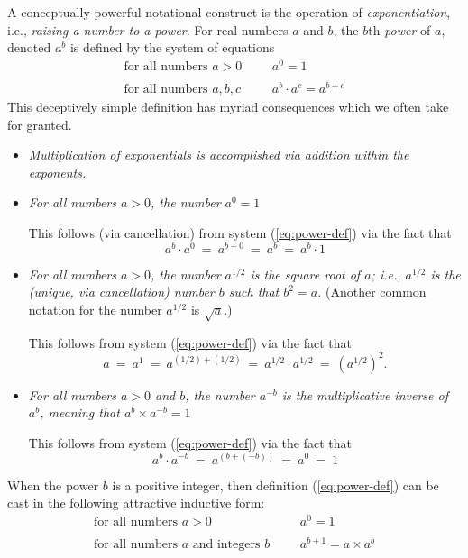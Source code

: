 
A conceptually powerful notational construct is the operation of {\it exponentiation},  i.e., {\it raising a number to a power}.  For real numbers $a$ and $b$, the  $b$th {\it power} of $a$, denoted $a^b$ is defined by the system of equations
\begin{equation}
\label{eq:power-def}
\begin{array}{llll}
\mbox{for all numbers $a>0$} & & & a^0 = 1 \\
 & & & \\
\mbox{for all numbers $a, b, c$} & & & a^b \cdot a^c = a^{b+c}
\end{array}
\end{equation}
This deceptively simple definition has myriad consequences which we often take for granted.
 
\begin{itemize}
\item
{\em Multiplication of exponentials is accomplished via addition within the exponents.}

\medskip\item
{\em For all numbers $a>0$, the number $a^0 = 1$}

\smallskip

This follows (via cancellation) from system (\ref{eq:power-def}) via the fact that
\[ a^b \cdot a^0 \ = \ a^{b+0} \ = \ a^b \ = \ a^b \cdot 1  \]

\medskip\item
{\em For all numbers $a >0$, the number $a^{1/2}$ is the {\it square root} of $a$; i.e., $a^{1/2}$ is the (unique, via cancellation) number $b$ such that $b^2 = a$.}
(Another common notation for the number $a^{1/2}$ is $\sqrt{a}$.)

\smallskip

This follows from system (\ref{eq:power-def}) via the fact that
\[ a \ = \ a^1 \ = \ a^{(1/2) + (1/2)} \ = \ a^{1/2} \cdot a^{1/2} \ = \ \left(a^{1/2}\right)^2. \]

\medskip\item
{\em For all numbers $a>0$ and $b$, the number $a^{-b}$ is the {\it multiplicative inverse} of $a^b$, meaning that $a^b \times a^{-b} = 1$}

\smallskip

This follows from system (\ref{eq:power-def}) via the fact that
\[ a^b \cdot a^{-b} \ = \ a^{(b + (-b))} \ = \ a^0 \ = \  1 \]
\end{itemize}
When the power $b$ is a positive integer, then definition (\ref{eq:power-def}) can be cast in the following attractive inductive form:
\begin{equation}
\label{eq:power-def-integer}
\begin{array}{llll}
\mbox{for all numbers $a>0$} & & & a^0 = 1 \\
 & & & \\
\mbox{for all numbers $a$ and integers $b$} & & & a^{b+1} = a \times a^b
\end{array}
\end{equation}

